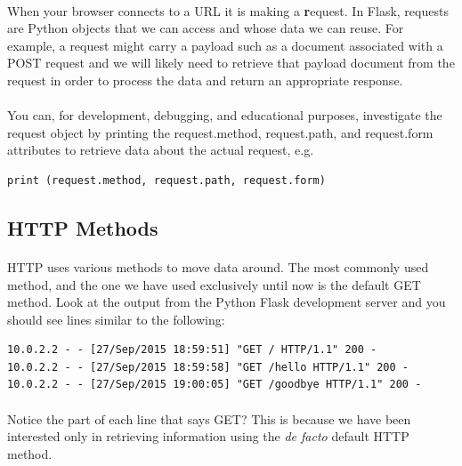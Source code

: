\documentclass[12pt, a4paper, oneside]{book}
\begin{document}
{\paragraph{} When your browser connects to a URL it is making a {\textbf request}. In Flask, requests are Python objects that we can access and whose data we can reuse. For example, a request might carry a payload such as a document associated with a POST request and we will likely need to retrieve that payload document from the request in order to process the data and return an appropriate response.

\paragraph{} You can, for development, debugging, and educational purposes, investigate the request object by printing the request.method, request.path, and request.form attributes to retrieve data about the actual request, e.g.

\begin{lstlisting}
print (request.method, request.path, request.form)
\end{lstlisting}

\subsection{HTTP Methods}
\label{http-methods}
\paragraph{} HTTP uses various methods to move data around. The most commonly used method, and the one we have used exclusively until now is the default GET method. Look at the output from the Python Flask development server and you should see lines similar to the following:

\begin{lstlisting}[style=DOS]
10.0.2.2 - - [27/Sep/2015 18:59:51] "GET / HTTP/1.1" 200 -
10.0.2.2 - - [27/Sep/2015 18:59:58] "GET /hello HTTP/1.1" 200 -
10.0.2.2 - - [27/Sep/2015 19:00:05] "GET /goodbye HTTP/1.1" 200 -
\end{lstlisting}

\paragraph{} Notice the part of each line that says GET? This is because we have been interested only in retrieving information using the \emph{de facto} default HTTP method.
}
\end{document}
